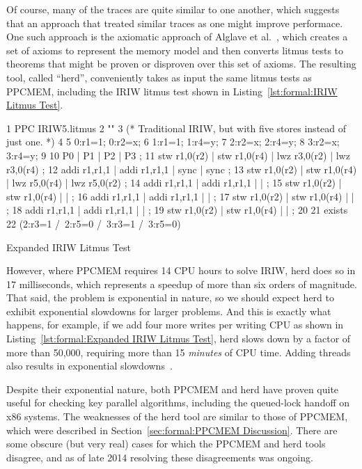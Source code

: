 Of course, many of the traces are quite similar to one another, which
suggests that an approach that treated similar traces as one might
improve performace.
One such approach is the axiomatic approach of
Alglave et al.~\cite{Alglave:2014:HCM:2594291.2594347},
which creates a set of axioms to represent the memory model and then
converts litmus tests to theorems that might be proven or disproven
over this set of axioms.
The resulting tool, called ``herd'',  conveniently takes as input the
same litmus tests as PPCMEM, including the IRIW litmus test shown in
Listing~\ref{lst:formal:IRIW Litmus Test}.

\begin{listing*}[tb]
{ \scriptsize
\begin{verbbox}
 1 PPC IRIW5.litmus
 2 ""
 3 (* Traditional IRIW, but with five stores instead of just one. *)
 4 {
 5 0:r1=1; 0:r2=x;
 6 1:r1=1;         1:r4=y;
 7         2:r2=x; 2:r4=y;
 8         3:r2=x; 3:r4=y;
 9 }
10 P0           | P1           | P2           | P3           ;
11 stw r1,0(r2) | stw r1,0(r4) | lwz r3,0(r2) | lwz r3,0(r4) ;
12 addi r1,r1,1 | addi r1,r1,1 | sync         | sync         ;
13 stw r1,0(r2) | stw r1,0(r4) | lwz r5,0(r4) | lwz r5,0(r2) ;
14 addi r1,r1,1 | addi r1,r1,1 |              |              ;
15 stw r1,0(r2) | stw r1,0(r4) |              |              ;
16 addi r1,r1,1 | addi r1,r1,1 |              |              ;
17 stw r1,0(r2) | stw r1,0(r4) |              |              ;
18 addi r1,r1,1 | addi r1,r1,1 |              |              ;
19 stw r1,0(r2) | stw r1,0(r4) |              |              ;
20 
21 exists
22 (2:r3=1 /\ 2:r5=0 /\ 3:r3=1 /\ 3:r5=0)
\end{verbbox}
}
\centering
\theverbbox
\caption{Expanded IRIW Litmus Test}
\label{lst:formal:Expanded IRIW Litmus Test}
\end{listing*}

However, where PPCMEM requires 14 CPU hours to solve IRIW, herd does so
in 17 milliseconds, which represents a speedup of more than six orders
of magnitude.
That said, the problem is exponential in nature, so we should expect
herd to exhibit exponential slowdowns for larger problems.
And this is exactly what happens, for example, if we add four more writes
per writing CPU as shown in
Listing~\ref{lst:formal:Expanded IRIW Litmus Test},
herd slows down by a factor of more than 50,000, requiring more than
15 \emph{minutes} of CPU time.
Adding threads also results in exponential
slowdowns~\cite{PaulEMcKenney2014weakaxiom}.

Despite their exponential nature, both PPCMEM and herd have proven quite
useful for checking key parallel algorithms, including the queued-lock
handoff on x86 systems.
The weaknesses of the herd tool are similar to those of PPCMEM, which
were described in
Section~\ref{sec:formal:PPCMEM Discussion}.
There are some obscure (but very real) cases for which the PPCMEM and
herd tools disagree, and as of late 2014 resolving these disagreements
was ongoing.

